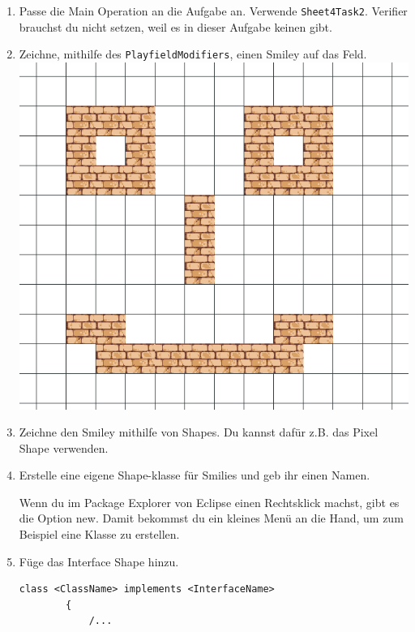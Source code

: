 \begin{enumerate}
    \item Passe die Main Operation an die Aufgabe an. Verwende \lstinline{Sheet4Task2}. Verifier brauchst du nicht setzen, weil es in dieser Aufgabe keinen gibt.
    \item Zeichne, mithilfe des \lstinline{PlayfieldModifiers}, einen Smiley auf das Feld.
    \\ \includegraphics[width=\linewidth]{./figures/smily.png}
    \item Zeichne den Smiley mithilfe von Shapes. Du kannst dafür z.B. das Pixel Shape verwenden.
    \item Erstelle eine eigene Shape-klasse für Smilies und geb ihr einen Namen.
    \begin{Infobox}
    Wenn du im Package Explorer von Eclipse einen Rechtsklick machst, gibt es die Option new.
    Damit bekommst du ein kleines Menü an die Hand, um zum Beispiel eine Klasse zu erstellen.
    \end{Infobox}
    \item Füge das Interface Shape hinzu.
    \begin{lstlisting}[title=Interface Syntax,frame=ltr]
        class <ClassName> implements <InterfaceName>
        {
            /...
    \end{lstlisting}
    \begin{Infobox}[Interface]

\end{Infobox}
\end{enumerate}
